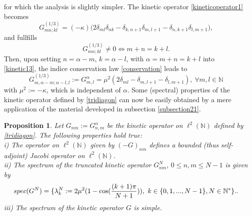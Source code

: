 \documentclass[a4paper,11pt,twoside]{article}
\numberwithin{equation}{section}
\newtheorem{proposition}[Theorem]{Proposition}
\theoremstyle{nonumberplain}
\newcounter{and}
\begin{document}
for which the analysis is slightly simpler. The kinetic operator \eqref{kineticoperator1} becomes
\begin{equation}
 G^{(1/3)}_{mn;kl}=(-\kappa)\big(2\delta_{ml}\delta_{nk} - \delta_{k,n+1}\delta_{m,l+1}-\delta_{n,k+1}\delta_{l,m+1}\big)\label{kinetic13},
\end{equation}
and fullfills
\begin{equation}
G^{(1/3)}_{mn;kl}\ne0\iff m+n=k+l\label{conservation}.
\end{equation}
Then, upon setting $n=\alpha-m$, $k=\alpha-l$, with $\alpha=m+n=k+l$ into \eqref{kinetic13}, the indice conservation law \eqref{conservation} leads to
\begin{equation}
G^{(1/3)}_{m,\alpha-m;\alpha-l,l}:=G^{\alpha}_{m,l}=\mu^2(2\delta_{ml}- \delta_{m,l+1}-\delta_{l,m+1}),\ \forall m,l\in\mathbb{N}\label{tridiagon}
\end{equation}
with $\mu^2:=-\kappa$, which is independent of $\alpha$. Some (spectral) properties of the kinetic operator defined by \eqref{tridiagon} can now be easily obtained by a mere application of the material developed in subsection \ref{subsection21}.
\begin{proposition}\label{kinetic-G}
Let $G_{nm}:=G^{\alpha}_{n,m}$ be the kinetic operator on $\ell^2(\mathbb{N})$ defined by \eqref{tridiagon}. The following properties hold true:\\
i) The operator on $\ell^2(\mathbb{N})$ given by $(-G)_{nm}$ defines a bounded (thus self-adjoint) Jacobi operator on $\ell^2(\mathbb{N})$.\\
ii) The spectrum of the truncated kinetic operator $G^N_{nm}$, $0\le n,m\le N-1$ is given by 
\begin{equation}
spec(G^N)=\{\lambda^N_k:=2\mu^2(1-\cos({{(k+1)\pi}\over{N+1}})), \ k\in\{0,1,...,N-1\}, N\in\mathbb{N}^*\}.\label{spectrum1}.
\end{equation}
iii) The spectrum of the kinetic operator $G$ is simple.
\end{proposition}
\end{document}
